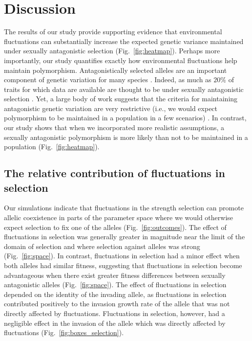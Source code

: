 \documentclass[12pt]{article}
\begin{document}
\section{Discussion}
The results of our study provide supporting evidence that environmental fluctuations can substantially increase the expected genetic variance maintained under sexually antagonistic selection (Fig.~\ref{fig:heatmap}). Perhaps more importantly, our study quantifies exactly how environmental fluctuations help maintain polymorphism. Antagonistically selected alleles are an important component of genetic variation for many species \citep{foerster2007sexually,van2009intralocus,bonduriansky2009intralocus,innocenti2010sexually}. Indeed, as much as $20\%$ of traits for which data are available are thought to be under sexually antagonistic selection \citep{morrissey2016meta}. Yet, a large body of work suggests that the criteria for maintaining antagonistic genetic variation are very restrictive (i.e., we would expect polymorphism to be maintained in a population in a few scenarios) \citep{kidwell1977regions,pamilo1979genic,hedrick1999antagonistic,curtsinger1994antagonistic, patten2010fitness}. In contrast, our study shows that when we incorporated more realistic assumptions, a sexually antagonistic polymorphism is more likely than not to be maintained in a population (Fig.~\ref{fig:heatmap}).


\subsection*{The relative contribution of fluctuations in selection}


Our simulations indicate that fluctuations in the strength selection can promote allelic coexistence in parts of the parameter space where we would otherwise expect selection to fix one of the alleles (Fig.~\ref{fig:outcomes}). The effect of fluctuations in selection was generally greater in magnitude near the limit of the domain of selection and where selection against alleles was strong (Fig.~\ref{fig:space}). In contrast, fluctuations in selection had a minor effect when both alleles had similar fitness, suggesting that fluctuations in selection become advantageous when there exist greater fitness differences between sexually antagonistic alleles (Fig.~\ref{fig:space}). The effect of fluctuations in selection depended on the identity of the invading allele, as fluctuations in selection contributed positively to the invasion growth rate of the allele that was not directly affected by fluctuations. Fluctuations in selection, however, had a negligible effect in the invasion of the allele which was directly affected by fluctuations (Fig.~\ref{fig:boxes_selection}).
\end{document}

